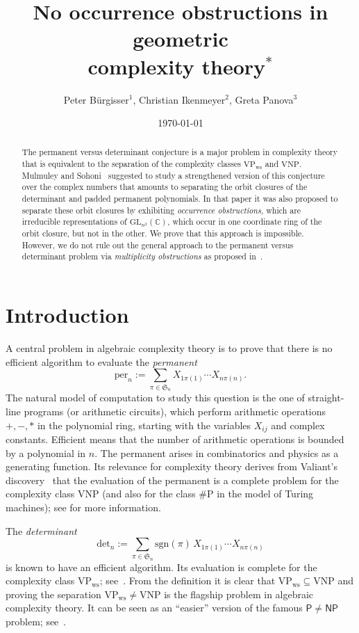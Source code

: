 \documentclass[11pt]{amsart}
\title[No occurrence obstructions in geometric complexity theory]{No
  occurrence obstructions in geometric\\ complexity theory$^*$}
\author[Peter B\"urgisser, Christian Ikenmeyer, Greta Panova]{Peter B\"urgisser$^1$, Christian Ikenmeyer$^2$, Greta Panova$^3$}
\date{\today}
\def\C{\mathbb{C}}
\def\det{\mathrm{det}}
\def\per{\mathrm{per}}
\def\sgn{\mathrm{sgn}}
\def\GL{\mathrm{GL}}
\def\VNP{\mathrm{VNP}}
\def\VPs{\mathrm{VP}_{\mathrm{ws}}}
\def\sP{\#\mathrm{P}}
\newcommand{\aS}{\ensuremath{\mathfrak{S}}}
\numberwithin{equation}{section}
\begin{document}
\raggedbottom

\begin{abstract}
The permanent versus determinant conjecture is a major problem in 
complexity theory that is equivalent to the separation of the
complexity classes $\VPs$ and $\VNP$.  
Mulmuley and Sohoni~\cite{gct1} suggested to 
study a strengthened version of this conjecture over the 
complex numbers that amounts to separating the orbit closures of 
the determinant and padded permanent polynomials. 
In that paper it was also proposed to separate these orbit closures 
by exhibiting {\em occurrence obstructions}, which are 
irreducible representations of $\GL_{n^2}(\C)$, which 
occur in one coordinate ring of the orbit closure, but not 
in the other. 
We prove that this approach is impossible. 
However, we do not rule out the general approach to the 
permanent versus determinant problem via 
{\em multiplicity obstructions} as proposed in~\cite{gct1}. 
\end{abstract}

\maketitle

\section{Introduction} 

A central problem in algebraic complexity theory is to prove that 
there is no efficient algorithm to evaluate the {\em permanent} 
$$
 \per_n := \sum_{\pi\in \aS_n} X_{1\pi(1)} \cdots X_{n\pi(n)}.
$$
The natural model of computation to study this question 
is the one of straight-line programs (or arithmetic circuits),
which perform arithmetic operations $+,-,*$ 
in the polynomial ring, 
starting with the variables $X_{ij}$ and complex constants. 
Efficient means that the number of arithmetic operations 
is bounded by a polynomial in $n$. 
The permanent arises in combinatorics and physics as a 
generating function. Its relevance for complexity theory 
derives from Valiant's discovery~\cite{Val:79a,Val:79}
that the evaluation of the permanent is a complete problem 
for the complexity class $\VNP$ 
(and also for the class $\sP$ in the model of Turing machines); 
see \cite{buer:00-3,mapo:08} for more information.   

The {\em determinant}  
\begin{equation*}%
 \det_n 
  := \sum_{\pi\in \aS_n} \sgn(\pi)\, X_{1\pi(1)} \cdots X_{n\pi(n)} 
\end{equation*}
is known to have an efficient algorithm.  
Its evaluation is complete for the complexity class $\VPs$; 
see~\cite{Val:79a,toda:92}. From the definition it is clear that 
$\VPs\subseteq \VNP$ and proving the separation 
$\VPs\ne\VNP$ is the flagship problem in algebraic complexity theory. 
It can be seen as an ``easier'' version of the famous 
$\mathsf{P}\ne\mathsf{NP}$ problem; see~\cite{buerg:00}.
\end{document}
